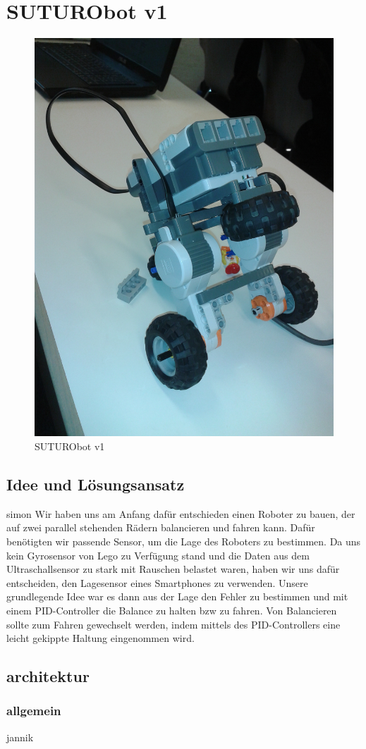 \documentclass[8pt]{article}
\begin{document}
\section{SUTURObot v1}
\begin{figure}[h]
  \begin{center}
    \includegraphics[width=.5\textwidth]{pictures/SUTURObot-v1.jpg}  
  \end{center}
  \caption{SUTURObot v1}
  \label{fig:SUTURObot1}
\end{figure}

\subsection{Idee und Lösungsansatz} simon
Wir haben uns am Anfang dafür entschieden einen Roboter zu bauen, der auf zwei parallel stehenden Rädern balancieren und fahren kann. Dafür benötigten wir passende Sensor, um die Lage des Roboters zu bestimmen. Da uns kein Gyrosensor von Lego zu Verfügung stand und die Daten aus dem Ultraschallsensor zu stark mit Rauschen belastet waren, haben wir uns dafür entscheiden, den Lagesensor eines Smartphones zu verwenden. Unsere grundlegende Idee war es dann aus der Lage den Fehler zu bestimmen und mit einem PID-Controller die Balance zu halten bzw zu fahren. Von Balancieren sollte zum Fahren gewechselt werden, indem mittels des PID-Controllers eine leicht gekippte Haltung eingenommen wird.

\subsection{architektur}

\subsubsection{allgemein} jannik
\end{document}
